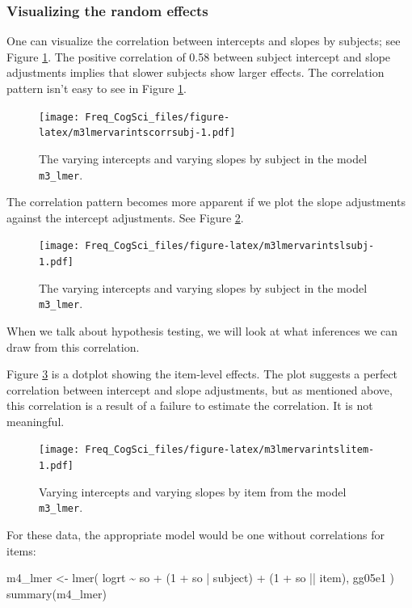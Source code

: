 \documentclass[
  12pt,
]{krantz}
\newenvironment{Shaded}{\begin{snugshade}}{\end{snugshade}}
\newcommand{\DecValTok}[1]{\textcolor[rgb]{0.00,0.00,0.81}{#1}}
\newcommand{\FunctionTok}[1]{\textcolor[rgb]{0.00,0.00,0.00}{#1}}
\newcommand{\NormalTok}[1]{#1}
\newcommand{\OtherTok}[1]{\textcolor[rgb]{0.56,0.35,0.01}{#1}}
\newcommand{\SpecialCharTok}[1]{\textcolor[rgb]{0.00,0.00,0.00}{#1}}
\theoremstyle{definition}
\theoremstyle{definition}
\theoremstyle{definition}
\theoremstyle{definition}
\theoremstyle{remark}
\begin{document}
\hypertarget{visualizing-the-random-effects}{%
\subsubsection{Visualizing the random effects}\label{visualizing-the-random-effects}}

One can visualize the correlation between intercepts and slopes by subjects; see Figure \ref{fig:m3lmervarintscorrsubj}. The positive correlation of 0.58 between subject intercept and slope adjustments implies that slower subjects show larger effects. The correlation pattern isn't easy to see in Figure \ref{fig:m3lmervarintscorrsubj}.

\begin{figure}
\centering
\texttt{[image: Freq\_CogSci\_files/figure-latex/m3lmervarintscorrsubj-1.pdf]}
\caption{\label{fig:m3lmervarintscorrsubj}The varying intercepts and varying slopes by subject in the model \texttt{m3\_lmer}.}
\end{figure}

The correlation pattern becomes more apparent if we plot the slope adjustments against the intercept adjustments. See Figure \ref{fig:m3lmervarintslsubj}.

\begin{figure}
\centering
\texttt{[image: Freq\_CogSci\_files/figure-latex/m3lmervarintslsubj-1.pdf]}
\caption{\label{fig:m3lmervarintslsubj}The varying intercepts and varying slopes by subject in the model \texttt{m3\_lmer}.}
\end{figure}

When we talk about hypothesis testing, we will look at what inferences we can draw from this correlation.

Figure \ref{fig:m3lmervarintslitem} is a
dotplot showing the item-level effects. The plot suggests a perfect correlation between intercept and slope adjustments, but as mentioned above, this correlation is a result of a failure to estimate the correlation. It is not meaningful.

\begin{figure}
\centering
\texttt{[image: Freq\_CogSci\_files/figure-latex/m3lmervarintslitem-1.pdf]}
\caption{\label{fig:m3lmervarintslitem}Varying intercepts and varying slopes by item from the model \texttt{m3\_lmer}.}
\end{figure}

For these data, the appropriate model would be one without correlations for items:

\begin{Shaded}
\begin{Highlighting}[]
\NormalTok{m4\_lmer }\OtherTok{\textless{}{-}} \FunctionTok{lmer}\NormalTok{(}
\NormalTok{  logrt }\SpecialCharTok{\textasciitilde{}}\NormalTok{ so }\SpecialCharTok{+}\NormalTok{ (}\DecValTok{1} \SpecialCharTok{+}\NormalTok{ so }\SpecialCharTok{|}\NormalTok{ subject) }\SpecialCharTok{+}\NormalTok{ (}\DecValTok{1} \SpecialCharTok{+}\NormalTok{ so }\SpecialCharTok{||}\NormalTok{ item),}
\NormalTok{  gg05e1}
\NormalTok{)}
\FunctionTok{summary}\NormalTok{(m4\_lmer)}
\end{Highlighting}
\end{Shaded}
\end{document}
